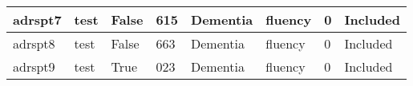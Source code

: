 \begin{center}
\begin{longtable}{|l|l|l|l|l|l|l|l|}
adrspt7        & test                  & False             & 615     & Dementia       & fluency         & 0            & Included      \\ \hline
adrspt8        & test                  & False             & 663     & Dementia       & fluency         & 0            & Included      \\ \hline
adrspt9        & test                  & True              & 023     & Dementia       & fluency         & 0            & Included      \\ \hline
\end{longtable}
\normalsize
\end{center}
